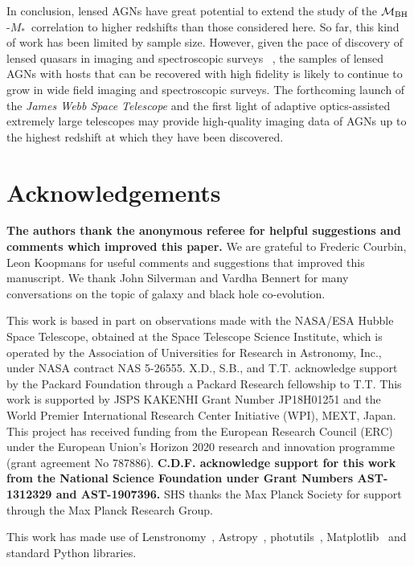 \documentclass[fleqn,usenatbib]{mnras}
\newcommand{\mbh}{$\mathcal M_{\rm BH}$}
\newcommand{\lenstronomy}{{\sc Lenstronomy}}
\newcommand{\mstar}{{$M_*$}}
\newcommand{\pink}[1]{{\textcolor{magenta}{#1}}}
\begin{document}

In conclusion, lensed AGNs have great potential to extend the study of the \mbh-\mstar\ correlation to higher redshifts than those considered here.  So far, this kind of work has been limited by sample size. However, given the pace of discovery of lensed quasars in imaging and spectroscopic surveys ~\citep[e.g.,][]{Oguri2010, Agn++15,Mor++16,Sch++16,Ost++17,Tre++18, Ang++18, Lem++20}, the samples of lensed AGNs with hosts that can be recovered with high fidelity is likely to continue to grow in wide field imaging and spectroscopic surveys. The forthcoming launch of the {\it James Webb Space Telescope} and the first light of adaptive optics-assisted extremely large telescopes may provide high-quality imaging data of AGNs up to the highest redshift at which they have been discovered.

\section*{Acknowledgements}
{\bf The authors thank the anonymous referee for helpful suggestions and comments which improved this paper.}
We are grateful to Frederic Courbin, Leon Koopmans for useful comments
and suggestions that improved this manuscript. We thank John Silverman and Vardha Bennert for many conversations on the topic of galaxy and black hole co-evolution.

This work is based in part on observations made with the NASA/ESA Hubble Space Telescope, obtained at the Space Telescope Science Institute, which is operated by the Association of Universities for Research in Astronomy, Inc., under NASA contract NAS 5-26555. X.D., S.B., and T.T. acknowledge support by the Packard Foundation through a Packard Research fellowship to T.T. This work is supported by JSPS KAKENHI Grant Number JP18H01251 and the World Premier International Research Center Initiative (WPI), MEXT, Japan. This project has received funding from the European Research Council (ERC) under the European Union's Horizon 2020 research and innovation programme (grant agreement No 787886).
{\bf C.D.F. acknowledge support for this work from the National Science Foundation under Grant Numbers AST-1312329 and AST-1907396.}
SHS thanks the Max Planck Society for support through the Max Planck Research Group.

This work has made use of \lenstronomy~\citep{lenstronomy}, {\sc Astropy}~\citep{Astropy}, {\sc photutils}~\citep{photutils}, {\sc Matplotlib}~\citep{Matplotlib} and standard Python libraries.
\end{document}
